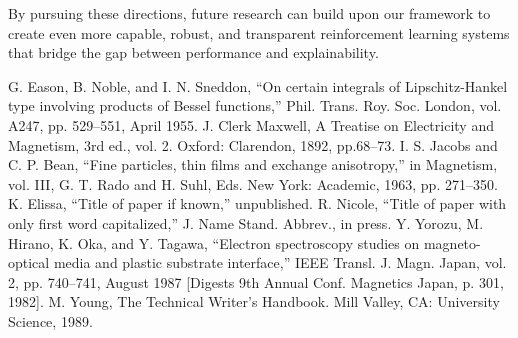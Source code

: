 \documentclass[conference]{IEEEtran}
\begin{document}
By pursuing these directions, future research can build upon our framework to create even more capable, robust, and transparent reinforcement learning systems that bridge the gap between performance and explainability.

\begin{thebibliography}{00}
 G. Eason, B. Noble, and I. N. Sneddon, ``On certain integrals of Lipschitz-Hankel type involving products of Bessel functions,'' Phil. Trans. Roy. Soc. London, vol. A247, pp. 529--551, April 1955.
 J. Clerk Maxwell, A Treatise on Electricity and Magnetism, 3rd ed., vol. 2. Oxford: Clarendon, 1892, pp.68--73.
 I. S. Jacobs and C. P. Bean, ``Fine particles, thin films and exchange anisotropy,'' in Magnetism, vol. III, G. T. Rado and H. Suhl, Eds. New York: Academic, 1963, pp. 271--350.
 K. Elissa, ``Title of paper if known,'' unpublished.
 R. Nicole, ``Title of paper with only first word capitalized,'' J. Name Stand. Abbrev., in press.
 Y. Yorozu, M. Hirano, K. Oka, and Y. Tagawa, ``Electron spectroscopy studies on magneto-optical media and plastic substrate interface,'' IEEE Transl. J. Magn. Japan, vol. 2, pp. 740--741, August 1987 [Digests 9th Annual Conf. Magnetics Japan, p. 301, 1982].
 M. Young, The Technical Writer's Handbook. Mill Valley, CA: University Science, 1989.
\end{thebibliography}
\vspace{12pt}
\end{document}
